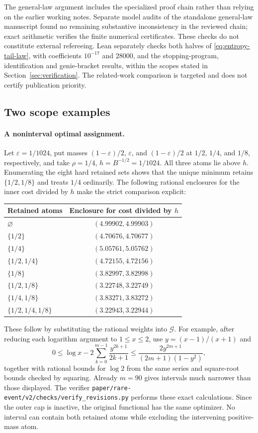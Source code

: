 The general-law argument includes the specialized proof chain rather
than relying on the earlier working notes. Separate model audits of the
standalone general-law manuscript found no remaining substantive
inconsistency in the reviewed chain; exact arithmetic verifies the
finite numerical certificates. These checks do
not constitute external refereeing. Lean separately checks both halves of
\eqref{eq:entropy-tail-law}, with coefficients $10^{-17}$ and $28000$, and
the stopping-program, identification and genie-bracket results, within the
scopes stated in Section~\ref{sec:verification}. The related-work comparison is targeted and does not
certify publication priority.


\subsection{Two scope examples}

\paragraph{A noninterval optimal assignment.}
Let $\varepsilon=1/1024$, put masses $(1-\varepsilon)/2$, $\varepsilon$,
and $(1-\varepsilon)/2$ at $1/2$, $1/4$, and $1/8$, respectively, and
take $\rho=1/4$, $h=B^{-1/2}=1/1024$.
All three atoms lie above $h$. Enumerating the eight hard retained sets
shows that the unique minimum retains $\{1/2,1/8\}$ and treats $1/4$
ordinarily. The following rational enclosures for the inner cost divided
by $h$ make the strict comparison explicit:
\begin{center}
\begin{tabular}{@{}lc@{}}
\toprule
Retained atoms & Enclosure for cost divided by $h$\\
\midrule
$\varnothing$ & $(4.99902,4.99903)$\\
$\{1/2\}$ & $(4.70676,4.70677)$\\
$\{1/4\}$ & $(5.05761,5.05762)$\\
$\{1/2,1/4\}$ & $(4.72155,4.72156)$\\
$\{1/8\}$ & $(3.82997,3.82998)$\\
$\{1/2,1/8\}$ & $(3.22748,3.22749)$\\
$\{1/4,1/8\}$ & $(3.83271,3.83272)$\\
$\{1/2,1/4,1/8\}$ & $(3.22943,3.22944)$\\
\bottomrule
\end{tabular}
\end{center}
These follow by substituting the rational weights into $\mathcal G$.
For example, after reducing each logarithm argument to $1\le x\le2$,
use $y=(x-1)/(x+1)$ and
\[
 0\le\log x-2\sum_{k=0}^{m-1}\frac{y^{2k+1}}{2k+1}
 \le\frac{2y^{2m+1}}{(2m+1)(1-y^2)},
\]
together with rational bounds for $\log2$ from the same series and
square-root bounds checked by squaring. Already $m=90$ gives intervals
much narrower than those displayed. The verifier
\nolinkurl{paper/rare-event/v2/checks/verify_revisions.py} performs these exact calculations.
Since the outer cap is inactive, the original functional has the same
optimizer. No interval can contain both retained atoms while excluding
the intervening positive-mass atom.

